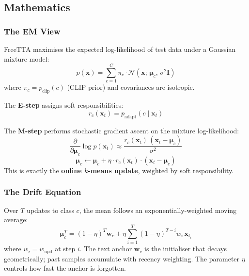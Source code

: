 \documentclass[12pt,a4paper]{article}
\newcommand{\bx}{\mathbf{x}}
\newcommand{\bw}{\mathbf{w}}
\newcommand{\bmu}{\boldsymbol{\mu}}
\newcommand{\1}{\mathbf{1}}
\begin{document}
\subsection{Mathematics}

\subsubsection{The EM View}

FreeTTA maximises the expected log-likelihood of test data under a Gaussian mixture model:
\begin{equation}
  p(\bx) = \sum_{c=1}^C \pi_c \cdot \mathcal{N}(\bx;\, \bmu_c,\, \sigma^2 \mathbf{I})
  \label{eq:gmm}
\end{equation}
where $\pi_c = p_{\text{clip}}(c)$ (CLIP prior) and covariances are isotropic.

The \textbf{E-step} assigns soft responsibilities:
\begin{equation}
  r_c(\bx_t) = p_{\text{adapt}}(c \mid \bx_t)
\end{equation}

The \textbf{M-step} performs stochastic gradient ascent on the mixture log-likelihood:
\begin{equation}
  \frac{\partial}{\partial \bmu_c} \log p(\bx_t) \approx \frac{r_c(\bx_t)\,(\bx_t - \bmu_c)}{\sigma^2}
  \label{eq:mstep_grad}
\end{equation}
\begin{equation}
  \bmu_c \leftarrow \bmu_c + \eta \cdot r_c(\bx_t) \cdot (\bx_t - \bmu_c)
  \label{eq:online_kmeans}
\end{equation}
This is exactly the \textbf{online $k$-means update}, weighted by soft responsibility.

\subsubsection{The Drift Equation}

Over $T$ updates to class $c$, the mean follows an exponentially-weighted moving average:
\begin{equation}
  \bmu_c^T = (1-\eta)^T \bw_c + \eta \sum_{i=1}^T (1-\eta)^{T-i} w_i\, \bx_{t_i}
  \label{eq:drift}
\end{equation}
where $w_i = w_{\text{upd}}$ at step $i$.
The text anchor $\bw_c$ is the initialiser that decays geometrically; past samples accumulate with recency weighting.
The parameter $\eta$ controls how fast the anchor is forgotten.
\end{document}
